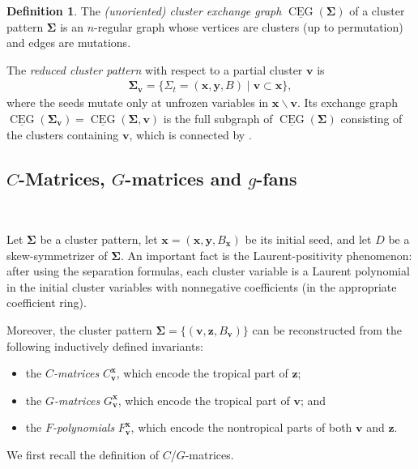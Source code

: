 \documentclass[11pt,reqno]{amsart}
\theoremstyle{plain}
\theoremstyle{definition}
\newtheorem{definition}[theorem]{Definition}
\numberwithin{equation}{section}
\newcommand\<{\langle}
\renewcommand\>{\rangle}
\newcommand{\CEG}{\operatorname{CEG}} %
\newcommand{\uCEG}{\underline{\CEG}} %
\def\vv{\mathbf{v}}
\def\seed{\Sigma}
\def\seeds{\mathbf{\Sigma}}
\def\xx{\mathbf{x}}%
\def\yy{\mathbf{y}}%
\def\zz{\mathbf{z}}
\def\regT{\mathbb{T}}%
\def\Cmat{{C}}
\def\Gmat{{G}}
\def\Fpoly{{F}}
\begin{document}
\begin{definition}\label{def:CEG}
The \emph{(unoriented) cluster exchange graph} $\uCEG(\seeds)$ of a cluster pattern $\seeds$ is an $n$-regular graph whose vertices are clusters (up to permutation) and edges are mutations.
\end{definition}

The \emph{reduced cluster pattern} with respect to a partial cluster $\vv$ is
\begin{gather}\label{eq:red-pattern}
    \seeds_\vv=\{ \seed_t=(\xx,\yy,B)    \mid    \vv\subset\xx \},
\end{gather}
where the seeds mutate only at unfrozen variables in $\xx\backslash\vv$.
Its exchange graph $\uCEG(\seeds_\vv)=\uCEG(\seeds,\vv)$ is the full subgraph of $\uCEG(\seeds)$ consisting of the clusters containing $\vv$, which is connected by \cite[Thm.~10]{CL2}.



\subsection{$C$-Matrices, $G$-matrices and $g$-fans}\label{sec:gc}\

Let $\seeds$ be a cluster pattern, let $\xx=(\xx,\yy,B_\xx)$ be its initial seed, and let $D$ be a skew-symmetrizer of $\seeds$.
An important fact is the Laurent-positivity phenomenon: after using the separation formulas, each cluster variable is a Laurent polynomial in the initial cluster variables with nonnegative coefficients (in the appropriate coefficient ring). 

Moreover, the cluster pattern $\seeds=\{(\vv,\zz,B_{\vv})\}$ can be reconstructed from the following inductively defined invariants:
\begin{itemize}
    \item the \emph{$C$-matrices} $\Cmat^\xx_\vv$, which encode the tropical part of $\zz$;
    \item the \emph{$G$-matrices} $\Gmat^\xx_\vv$, which encode the tropical part of $\vv$; and
    \item the \emph{$F$-polynomials} $\Fpoly^\xx_\vv$, which encode the nontropical parts of both $\vv$ and $\zz$.
\end{itemize}
We first recall the definition of $C$/$G$-matrices.
\end{document}

